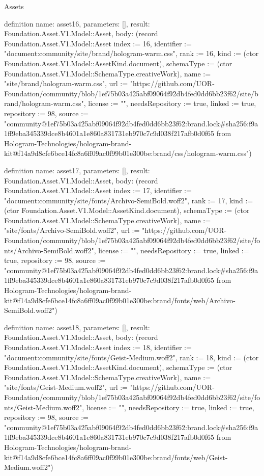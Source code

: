 \begin{lexlean}{Assets}
\begin{semanticmodule}
definition{
  name: asset16,
  parameters: [],
  result: Foundation.Asset.V1.Model::Asset,
  body: (record Foundation.Asset.V1.Model::Asset {index := 16, identifier := "document:community/site/brand/hologram-warm.css", rank := 16, kind := (ctor Foundation.Asset.V1.Model::AssetKind.document), schemaType := (ctor Foundation.Asset.V1.Model::SchemaType.creativeWork), name := "site/brand/hologram-warm.css", url := "https://github.com/UOR-Foundation/community/blob/1ef75b03a425abf09064f92db4fed0dd6bb23f62/site/brand/hologram-warm.css", license := "", needsRepository := true, linked := true, repository := 98, source := "community@1ef75b03a425abf09064f92db4fed0dd6bb23f62:brand.lock#sha256:f9a1ff9eba345339dce8b4601a1e860a831731eb970c7c9d038f217afb0d0f65 from Hologram-Technologies/hologram-brand-kit@f14a9d8cfe6bce14fc8a6ff09ac0f99b01e300be:brand/css/hologram-warm.css"})
}

definition{
  name: asset17,
  parameters: [],
  result: Foundation.Asset.V1.Model::Asset,
  body: (record Foundation.Asset.V1.Model::Asset {index := 17, identifier := "document:community/site/fonts/Archivo-SemiBold.woff2", rank := 17, kind := (ctor Foundation.Asset.V1.Model::AssetKind.document), schemaType := (ctor Foundation.Asset.V1.Model::SchemaType.creativeWork), name := "site/fonts/Archivo-SemiBold.woff2", url := "https://github.com/UOR-Foundation/community/blob/1ef75b03a425abf09064f92db4fed0dd6bb23f62/site/fonts/Archivo-SemiBold.woff2", license := "", needsRepository := true, linked := true, repository := 98, source := "community@1ef75b03a425abf09064f92db4fed0dd6bb23f62:brand.lock#sha256:f9a1ff9eba345339dce8b4601a1e860a831731eb970c7c9d038f217afb0d0f65 from Hologram-Technologies/hologram-brand-kit@f14a9d8cfe6bce14fc8a6ff09ac0f99b01e300be:brand/fonts/web/Archivo-SemiBold.woff2"})
}

definition{
  name: asset18,
  parameters: [],
  result: Foundation.Asset.V1.Model::Asset,
  body: (record Foundation.Asset.V1.Model::Asset {index := 18, identifier := "document:community/site/fonts/Geist-Medium.woff2", rank := 18, kind := (ctor Foundation.Asset.V1.Model::AssetKind.document), schemaType := (ctor Foundation.Asset.V1.Model::SchemaType.creativeWork), name := "site/fonts/Geist-Medium.woff2", url := "https://github.com/UOR-Foundation/community/blob/1ef75b03a425abf09064f92db4fed0dd6bb23f62/site/fonts/Geist-Medium.woff2", license := "", needsRepository := true, linked := true, repository := 98, source := "community@1ef75b03a425abf09064f92db4fed0dd6bb23f62:brand.lock#sha256:f9a1ff9eba345339dce8b4601a1e860a831731eb970c7c9d038f217afb0d0f65 from Hologram-Technologies/hologram-brand-kit@f14a9d8cfe6bce14fc8a6ff09ac0f99b01e300be:brand/fonts/web/Geist-Medium.woff2"})
}


\end{semanticmodule}
\end{lexlean}
